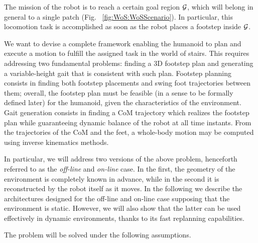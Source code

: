 The mission of the robot is to reach a certain goal region $\cal G$, which will belong in general to a single patch (Fig.~ \ref{fig:WoS:WoSScenario}). In particular, this locomotion task is accomplished as soon as the robot places a footstep inside $\cal G$.

We want to devise a complete framework enabling the humanoid to plan and execute a motion to fulfill the assigned task in the world of stairs.
This requires addressing two fundamental problems: finding a 3D footstep plan and generating a variable-height gait that is consistent with such plan.
Footstep planning consists in finding both footstep placements and swing foot trajectories between them; overall, the footstep plan must be feasible (in a sense to be formally defined later) for the humanoid, given the characteristics of the environment. Gait generation consists in finding a CoM trajectory which realizes the footstep plan while guaranteeing dynamic balance of the robot at all time instants. From the trajectories of the CoM and the feet, a whole-body motion may be computed using inverse kinematics methods.

In particular, we will address two versions of the above problem, henceforth referred to as the \textit{off-line} and \textit{on-line} case. In the first, the geometry of the environment is completely known in advance, while in the second it is reconstructed by the robot itself as it moves. 
In the following we describe the architectures designed for the off-line and on-line case supposing that the environment is static.
However, we will also show that the latter can be used effectively in dynamic environments, thanks to its fast replanning capabilities. 

The problem will be solved under the following assumptions.


